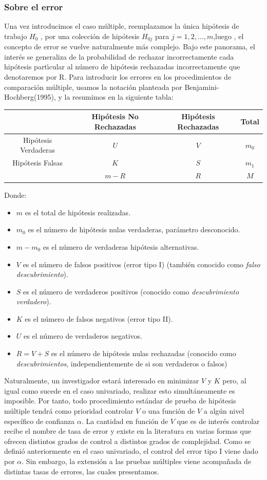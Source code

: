 \documentclass[11pt,letterpaper]{article}
\begin{document}
\subsubsection{Sobre el error}
Una vez introducimos el caso múltiple, reemplazamos la única hipótesis de trabajo $H_0$ , por una colección de hipótesis $H_{0j}$ para $j = 1, 2, \dots, m$,luego , el concepto de error se vuelve naturalmente más
complejo. Bajo este panorama, el interés se generaliza de la probabilidad de rechazar incorrectamente
cada hipótesis partı́cular al número de hipótesis rechazadas incorrectamente que denotaremos por R. Para introducir los errores en los procedimientos de comparación múltiple, usamos la notación planteada por Benjamini-Hochberg(1995), y la resumimos en la siguiente tabla:
\begin{center}
\begin{tabular}{|c|c|c|c|}
	\hline & Hipótesis No Rechazadas & Hipótesis Rechazadas & Total \\
	\hline Hipótesis Verdaderas & $U$ & $V$ & $m_{0}$ \\
	Hipótesis Falsas & $K$ & $S$ & $m_{1}$ \\
	\hline & $m-R$ & $R$ & $M$ \\
	\hline
\end{tabular}	
\end{center}

Donde:
\begin{itemize}
	\item $m$ es el total de hipótesis realizadas.
	\item $m_0$ es el número de hipótesis nulas verdaderas, parámetro desconocido.
	\item $m-m_0$ es el número de verdaderas hipótesis alternativas.
	\item $V$ es el número de falsos positivos (error tipo I) (también conocido como \textit{falso descubrimiento}).
	\item $S$ es el número de verdaderos positivos (conocido como \textit{descubrimiento verdadero}).
	\item $K$ es el número de falsos negativos (error tipo II).
	\item $U$ es el número de verdaderos negativos.
	\item $R=V+S$ es el número de hipótesis nulas rechazadas (conocido como \textit{descubrimientos}, independientemente de si son verdaderos o falsos)
\end{itemize}
Naturalmente, un investigador estará interesado en minimizar $V$ y $K$ pero, al igual como sucede en el caso univariado, realizar esto simultáneamente es imposible. Por tanto, todo procedimiento estándar de prueba de hipótesis múltiple tendrá como prioridad controlar $V$ o una función de $V$ a algún nivel específico de confianza $\alpha$. La cantidad en función de $V$ que es de interés controlar recibe el nombre de tasa de error y existe en la literatura en varias formas que ofrecen distintos grados de control a distintos grados de complejidad. Como se definió anteriormente en el caso univariado, el control del error tipo I viene dado por $\alpha$. Sin embargo, la extensión a las pruebas múltiples viene acompañada de distintas tasas de errores, las cuales presentamos.
\end{document}
